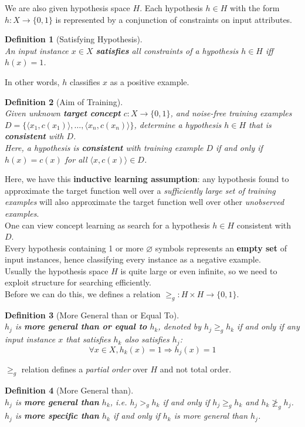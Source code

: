 \documentclass[12pt]{article}
\newtheorem{definition}{Definition}[section]
\theoremstyle{definition}
\begin{document}
We are also given hypothesis space $H$. Each hypothesis $h\in H$ with the form $h: X\to \{0,1\}$ is represented by a conjunction of constraints on input attributes.
\begin{definition}[Satisfying Hypothesis]
\hfill\\\normalfont An input instance $x\in X$ \textbf{satisfies} all constraints of a hypothesis $h\in H$ iff $h(x)=1$.
\end{definition}
In other words, $h$ classifies $x$ as a positive example.\\
\begin{definition}[Aim of Training]
\hfill\\\normalfont Given unknown \textbf{target concept} $c: X\to \{0,1\}$, and \textit{noise-free} training examples $D =  \{\langle x_1, c(x_1)\rangle, \ldots, \langle x_n, c(x_n)\rangle\}$, determine a hypothesis $h\in H$ that is \textbf{consistent} with $D$.\\
Here, a hypothesis is \textbf{consistent} with training example $D$ \textit{if and only if} $h(x)=c(x)$ for all $\langle x, c(x)\rangle\in D$.
\end{definition}
Here, we have this \textbf{inductive learning assumption}: any hypothesis found to approximate the target function well over a \textit{sufficiently large set of training examples} will also approximate the target function well over other \textit{unobserved examples}.\\
One can view concept learning as search for a hypothesis $h\in H$ consistent with $D$.\\
Every hypothesis containing 1 or more $\varnothing$ symbols represents an \textbf{empty set} of input instances, hence classifying every instance as a negative example.\\
Usually the hypothesis space $H$ is quite large or even infinite, so we need to exploit structure for searching efficiently.\\
Before we can do this, we defines a relation $\geq_g: H\times H\to \{0,1\}$.
\begin{definition}[More General than or Equal To]
\hfill\\\normalfont $h_j$ is \textbf{more general than or equal to} $h_k$, denoted by $h_j\geq_g h_k$ if and only if any input instance $x$ that satisfies $h_k$ also satisfies $h_j$:
\[
\forall x\in X, h_k(x)=1\Rightarrow h_j(x)=1
\]
\end{definition}
$\geq_g$ relation defines a \textit{partial order} over $H$ and not total order.
\begin{definition}[More General than]
\hfill\\\normalfont $h_j$ is \textbf{more general than} $h_k$, i.e. $h_j>_g h_k$ if and only if $h_j\geq_g h_k$ and $h_k\not\geq_g h_j$.\\
$h_j$ is \textbf{more specific than} $h_k$ if and only if $h_k$ is more general than $h_j$.
\end{definition}
\end{document}
